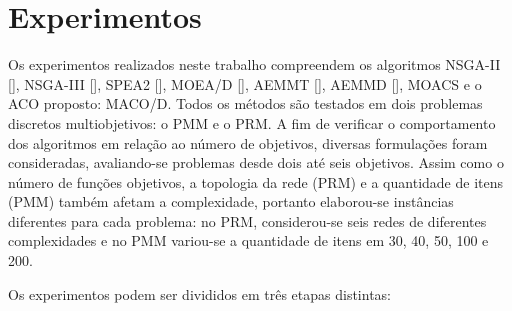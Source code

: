 \chapter[Experimentos]{Experimentos}

Os experimentos realizados neste trabalho compreendem os algoritmos NSGA-II [], NSGA-III [], SPEA2 [], MOEA/D [], AEMMT [], AEMMD [], MOACS e o ACO proposto: MACO/D. Todos os métodos são testados em dois problemas discretos multiobjetivos: o PMM e o PRM. A fim  de verificar o comportamento dos algoritmos em relação ao número de objetivos, diversas formulações foram consideradas, avaliando-se problemas desde dois até seis objetivos. Assim como o número de funções objetivos, a topologia da rede (PRM) e a quantidade de itens (PMM) também afetam a complexidade, portanto elaborou-se instâncias diferentes para cada problema: no PRM, considerou-se seis redes de diferentes complexidades e no PMM variou-se a quantidade de itens em 30, 40, 50, 100 e 200.

Os experimentos podem ser divididos em três etapas distintas:

